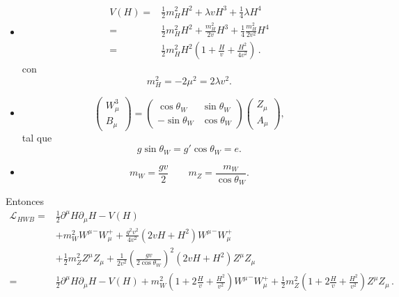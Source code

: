 \begin{itemize} %
\item
  \begin{align}
    V(H)=&\tfrac{1}{2}m_H^2H^2+\lambda vH^3+\tfrac{1}{4}\lambda H^4\nonumber\\
    =&\frac{1}{2}m_H^2H^2+\frac{m_H^2}{2v}H^3+\frac{1}{4}\frac{m_H^2}{2v^2} H^4\nonumber\\
    =&\frac{1}{2}m_H^2H^2\left(1+\frac{H}{v}+\frac{H^2}{4v^2}\right)\,.
  \end{align}
con
\begin{equation}
  m_H^2=-2\mu^2=2\lambda v^2.
\end{equation}

\item 
\begin{equation}
\label{eq:262}
  \begin{pmatrix}
    W^3_\mu\\
    B_\mu
  \end{pmatrix}=\begin{pmatrix}
    \cos\theta_W & \sin\theta_W\\
    -\sin\theta_W& \cos\theta_W
  \end{pmatrix}
  \begin{pmatrix}
    Z_\mu\\
    A_\mu
  \end{pmatrix},
\end{equation}
tal que
\begin{equation}
  \label{eq:263}
  g\sin\theta_W=g'\cos\theta_W=e.
\end{equation}
\item
  \begin{equation}
    m_W=\frac{gv}{2}\qquad m_Z=\frac{m_W}{\cos\theta_W}.
  \end{equation}
\end{itemize} %
Entonces
\begin{align}
\mathcal{L}_{H W B}=&\frac{1}{2}\partial^\mu H\partial_\mu H-V(H)\nonumber\\
&+m_W^2{W^\mu}^-W_\mu^++\frac{g^2v^2}{4v^2}(2vH+H^2){W^\mu}^-W_\mu^+\nonumber\\
  &+\frac{1}{2}m_Z^2Z^\mu Z_\mu+\frac{1}{2v^2}\left(\frac{gv}{2\cos\theta_W}\right)^2(2vH+H^2)Z^\mu Z_\mu\nonumber\\
  =&\frac{1}{2}\partial^\mu H\partial_\mu H-V(H)
  +m_W^2\left(1+2\frac{H}{v}+\frac{H^2}{v^2}\right){W^\mu}^-W_\mu^+
  +\frac{1}{2}m_Z^2\left(1+2\frac{H}{v}+\frac{H^2}{v^2}\right)Z^\mu Z_\mu\,.
\end{align}
